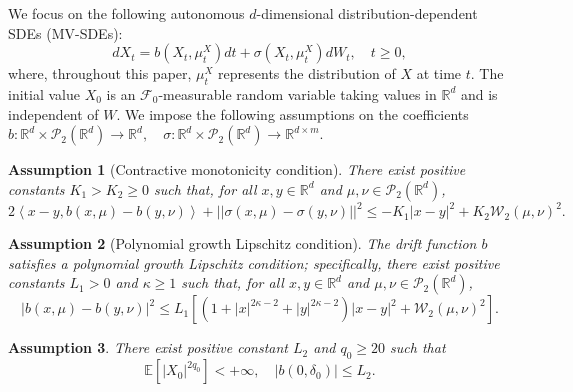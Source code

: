 \documentclass[12pt]{article}
\numberwithin{equation}{section}
\newtheorem{assumption}{Assumption}[section]
\begin{document}
We focus on the following autonomous $d$-dimensional  distribution-dependent SDEs (MV-SDEs):
\begin{equation}\tag{2.9}\label{MVSDEs}
d X_t=b\left(X_t, \mu_{t}^{X}\right) d t+\sigma\left(X_t, \mu_{t}^{X}\right) d W_t, \quad   t\geq 0,
\end{equation}
where, throughout this paper, $\mu_t^X$ represents the distribution of $X$ at time $t$. The initial value $X_0$ is an $\mathcal{F}_0$-measurable random variable taking values in $\mathbb{R}^d$ and is independent of $W$. We impose the following assumptions on the coefficients
$ 
b: \mathbb{R}^d \times \mathcal{P}_2\left(\mathbb{R}^d\right) \rightarrow \mathbb{R}^d, \quad \sigma : \mathbb{R}^d \times \mathcal{P}_2\left(\mathbb{R}^d\right) \rightarrow \mathbb{R}^{d \times m}  
$.
\begin{assumption}[Contractive monotonicity condition]\label{ass2.1}
There exist positive constants $K_1>K_2\geq 0$ such that, for all $x, y \in \mathbb{R}^d$ and $\mu, \nu \in \mathcal{P}_2\left(\mathbb{R}^d\right)$,
\begin{equation}\tag{2.10}\label{2.10}
2\left\langle x-y, b\left(x, \mu\right)-b\left(y, \nu\right)\right\rangle+\left|\left|\sigma\left(x, \mu\right)-\sigma\left(y, \nu\right)\right|\right|^2 \leq-K_1\left|x-y\right|^2+K_2 \mathcal{W}_2\left(\mu, \nu\right)^2.
\end{equation}
\end{assumption}
\begin{assumption}[Polynomial growth Lipschitz condition]\label{ass2.2}
The drift function $b$ satisfies a polynomial growth Lipschitz condition; specifically, there exist positive constants $L_1 > 0$ and $\kappa \geq 1$ such that, for all $x, y \in \mathbb{R}^d$ and $\mu, \nu \in \mathcal{P}_2\left(\mathbb{R}^d\right)$,
\begin{equation}\tag{2.11}\label{2.11}
\left|b\left( x,\mu \right) -b\left( y,\nu \right) \right|^2\leq L_1\left[ \left( 1+\left|x\right|^{2\kappa -2}+\left|y\right|^{2\kappa -2} \right) \left|x-y\right|^2+\mathcal{W}_2\left( \mu ,\nu \right) ^2 \right].
\end{equation}
\end{assumption}
\begin{assumption}\label{ass2.3}
 There exist positive constant $L_2$ and $q_0 \geq 20$ such that
\begin{equation}\tag{2.12}\label{2.12}
 \mathbb{E}\left[ \left| X_0 \right|^{2q_0} \right] <+\infty,\quad \left| b\left( 0,\delta _0 \right) \right|\leq L_2.
 \end{equation}
\end{assumption}
\end{document}
